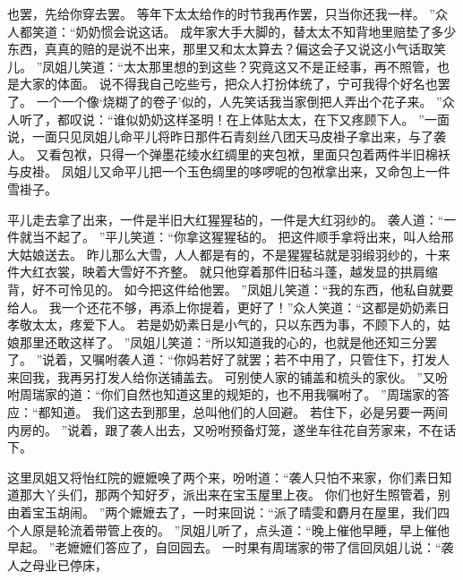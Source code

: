 也罢，先给你穿去罢。
等年下太太给作的时节我再作罢，只当你还我一样。
”众人都笑道：“奶奶惯会说这话。
成年家大手大脚的，替太太不知背地里赔垫了多少东西，真真的赔的是说不出来，那里又和太太算去？偏这会子又说这小气话取笑儿。
”凤姐儿笑道：“太太那里想的到这些？究竟这又不是正经事，再不照管，也是大家的体面。
说不得我自己吃些亏，把众人打扮体统了，宁可我得个好名也罢了。
一个一个像‘烧糊了的卷子’似的，人先笑话我当家倒把人弄出个花子来。
”众人听了，都叹说：“谁似奶奶这样圣明！在上体贴太太，在下又疼顾下人。
”一面说，一面只见凤姐儿命平儿将昨日那件石青刻丝八团天马皮褂子拿出来，与了袭人。
又看包袱，只得一个弹墨花绫水红绸里的夹包袱，里面只包着两件半旧棉袄与皮褂。
凤姐儿又命平儿把一个玉色绸里的哆啰呢的包袱拿出来，又命包上一件雪褂子。
\par
平儿走去拿了出来，一件是半旧大红猩猩毡的，一件是大红羽纱的。
袭人道：“一件就当不起了。
”平儿笑道：“你拿这猩猩毡的。
把这件顺手拿将出来，叫人给邢大姑娘送去。
昨儿那么大雪，人人都是有的，不是猩猩毡就是羽缎羽纱的，十来件大红衣裳，映着大雪好不齐整。
就只他穿着那件旧毡斗蓬，越发显的拱肩缩背，好不可怜见的。
如今把这件给他罢。
”凤姐儿笑道：“我的东西，他私自就要给人。
我一个还花不够，再添上你提着，更好了！”众人笑道：“这都是奶奶素日孝敬太太，疼爱下人。
若是奶奶素日是小气的，只以东西为事，不顾下人的，姑娘那里还敢这样了。
”凤姐儿笑道：“所以知道我的心的，也就是他还知三分罢了。
”说着，又嘱咐袭人道：“你妈若好了就罢；若不中用了，只管住下，打发人来回我，我再另打发人给你送铺盖去。
可别使人家的铺盖和梳头的家伙。
”又吩咐周瑞家的道：“你们自然也知道这里的规矩的，也不用我嘱咐了。
”周瑞家的答应：“都知道。
我们这去到那里，总叫他们的人回避。
若住下，必是另要一两间内房的。
”说着，跟了袭人出去，又吩咐预备灯笼，遂坐车往花自芳家来，不在话下。
\par
这里凤姐又将怡红院的嬷嬷唤了两个来，吩咐道：“袭人只怕不来家，你们素日知道那大丫头们，那两个知好歹，派出来在宝玉屋里上夜。
你们也好生照管着，别由着宝玉胡闹。
”两个嬷嬷去了，一时来回说：“派了晴雯和麝月在屋里，我们四个人原是轮流着带管上夜的。
”凤姐儿听了，点头道：“晚上催他早睡，早上催他早起。
”老嬷嬷们答应了，自回园去。
一时果有周瑞家的带了信回凤姐儿说：“袭人之母业已停床，
